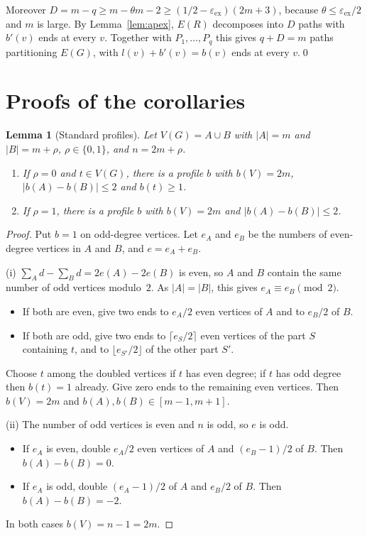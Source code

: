 \documentclass[11pt]{article}
\newtheorem{lemma}[theorem]{Lemma}
\theoremstyle{definition}
\newcommand{\eps}{\varepsilon}
\newcommand{\epsex}{\eps_{\mathrm{ex}}}
\begin{document}
Moreover $D=m-q\ge m-\theta m-2\ge(1/2-\epsex)(2m+3)$, because $\theta\le\epsex/2$ and $m$ is large. By Lemma~\ref{lem:apex}, $E(R)$ decomposes into $D$ paths with $b'(v)$ ends at every $v$. Together with $P_1,\dots,P_q$ this gives $q+D=m$ paths partitioning $E(G)$, with $l(v)+b'(v)=b(v)$ ends at every $v$.\qed

\section{Proofs of the corollaries}\label{sec:cor}

\begin{lemma}[Standard profiles]\label{lem:profiles}
Let $V(G)=A\cup B$ with $|A|=m$ and $|B|=m+\rho$, $\rho\in\{0,1\}$, and $n=2m+\rho$.
\begin{enumerate}[label=\textup{(\roman*)},nosep]
\item If $\rho=0$ and $t\in V(G)$, there is a profile $b$ with $b(V)=2m$, $|b(A)-b(B)|\le2$ and $b(t)\ge1$.
\item If $\rho=1$, there is a profile $b$ with $b(V)=2m$ and $|b(A)-b(B)|\le2$.
\end{enumerate}
\end{lemma}

\begin{proof}
Put $b=1$ on odd-degree vertices. Let $e_A$ and $e_B$ be the numbers of even-degree vertices in $A$ and $B$, and $e=e_A+e_B$.

(i) $\sum_Ad-\sum_Bd=2e(A)-2e(B)$ is even, so $A$ and $B$ contain the same number of odd vertices modulo~$2$. As $|A|=|B|$, this gives $e_A\equiv e_B\pmod2$.
\begin{itemize}[nosep]
\item If both are even, give two ends to $e_A/2$ even vertices of $A$ and to $e_B/2$ of $B$.
\item If both are odd, give two ends to $\lceil e_S/2\rceil$ even vertices of the part $S$ containing $t$, and to $\lfloor e_{S'}/2\rfloor$ of the other part $S'$.
\end{itemize}
Choose $t$ among the doubled vertices if $t$ has even degree; if $t$ has odd degree then $b(t)=1$ already. Give zero ends to the remaining even vertices. Then $b(V)=2m$ and $b(A),b(B)\in[m-1,m+1]$.

(ii) The number of odd vertices is even and $n$ is odd, so $e$ is odd.
\begin{itemize}[nosep]
\item If $e_A$ is even, double $e_A/2$ even vertices of $A$ and $(e_B-1)/2$ of $B$. Then $b(A)-b(B)=0$.
\item If $e_A$ is odd, double $(e_A-1)/2$ of $A$ and $e_B/2$ of $B$. Then $b(A)-b(B)=-2$.
\end{itemize}
In both cases $b(V)=n-1=2m$.
\end{proof}
\end{document}
